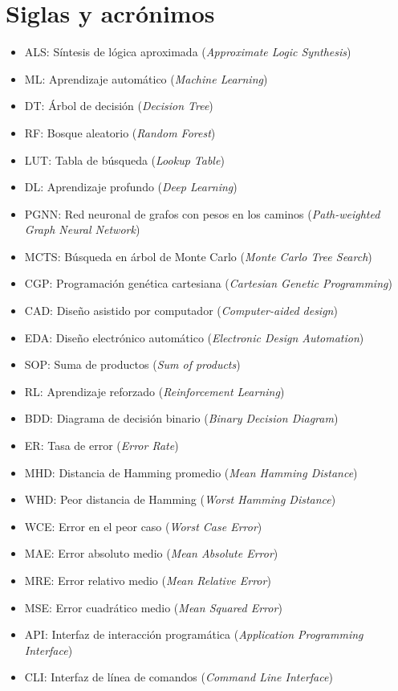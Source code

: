 \chapter*{Siglas y acrónimos}

\begin{itemize}
  \item ALS: Síntesis de lógica aproximada (\emph{Approximate Logic Synthesis})
  \item ML: Aprendizaje automático (\emph{Machine Learning})
  \item DT: Árbol de decisión (\emph{Decision Tree})
  \item RF: Bosque aleatorio (\emph{Random Forest})
  \item LUT: Tabla de búsqueda (\emph{Lookup Table})
  \item DL: Aprendizaje profundo (\emph{Deep Learning})
  \item PGNN: Red neuronal de grafos con pesos en los caminos (\emph{Path-weighted Graph Neural Network})
  \item MCTS: Búsqueda en árbol de Monte Carlo (\emph{Monte Carlo Tree Search})
  \item CGP: Programación genética cartesiana (\emph{Cartesian Genetic Programming})
  \item CAD: Diseño asistido por computador (\emph{Computer-aided design})
  \item EDA: Diseño electrónico automático (\emph{Electronic Design Automation})
  \item SOP: Suma de productos (\emph{Sum of products})
  \item RL: Aprendizaje reforzado (\emph{Reinforcement Learning})
  \item BDD: Diagrama de decisión binario (\emph{Binary Decision Diagram})
  \item ER: Tasa de error (\emph{Error Rate})
  \item MHD: Distancia de Hamming promedio (\emph{Mean Hamming Distance})
  \item WHD: Peor distancia de Hamming (\emph{Worst Hamming Distance})
  \item WCE: Error en el peor caso (\emph{Worst Case Error})
  \item MAE: Error absoluto medio (\emph{Mean Absolute Error})
  \item MRE: Error relativo medio (\emph{Mean Relative Error})
  \item MSE: Error cuadrático medio (\emph{Mean Squared Error})
  \item API: Interfaz de interacción programática (\emph{Application Programming Interface})
  \item CLI: Interfaz de línea de comandos (\emph{Command Line Interface})
\end{itemize}
